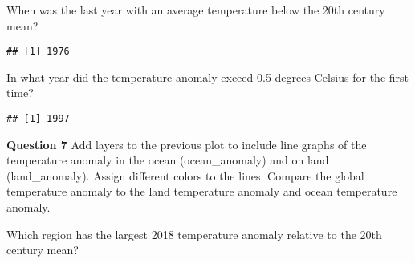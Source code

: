 \documentclass[]{article}
\newenvironment{Shaded}{\begin{snugshade}}{\end{snugshade}}
\newcommand{\DecValTok}[1]{\textcolor[rgb]{0.00,0.00,0.81}{#1}}
\newcommand{\FloatTok}[1]{\textcolor[rgb]{0.00,0.00,0.81}{#1}}
\newcommand{\KeywordTok}[1]{\textcolor[rgb]{0.13,0.29,0.53}{\textbf{#1}}}
\newcommand{\NormalTok}[1]{#1}
\newcommand{\OperatorTok}[1]{\textcolor[rgb]{0.81,0.36,0.00}{\textbf{#1}}}
\newcommand{\StringTok}[1]{\textcolor[rgb]{0.31,0.60,0.02}{#1}}
\begin{document}
When was the last year with an average temperature below the 20th
century mean?

\begin{Shaded}
\end{Shaded}

\begin{verbatim}
## [1] 1976
\end{verbatim}

In what year did the temperature anomaly exceed 0.5 degrees Celsius for
the first time?

\begin{Shaded}
\end{Shaded}

\begin{verbatim}
## [1] 1997
\end{verbatim}

\textbf{Question 7} Add layers to the previous plot to include line
graphs of the temperature anomaly in the ocean (ocean\_anomaly) and on
land (land\_anomaly). Assign different colors to the lines. Compare the
global temperature anomaly to the land temperature anomaly and ocean
temperature anomaly.

Which region has the largest 2018 temperature anomaly relative to the
20th century mean?
\end{document}
